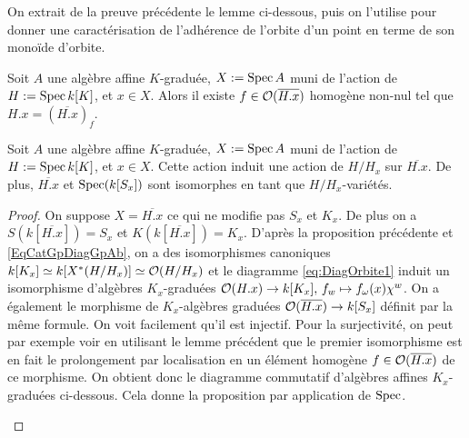 On extrait de la preuve précédente le lemme ci-dessous, puis on l'utilise pour donner une caractérisation de l'adhérence de l'orbite d'un point en terme de son monoïde d'orbite.

\begin{lem}
Soit $A$ une algèbre affine $K$-graduée, $X:=\operatorname{Spec} A$ muni de l'action de $H:=\operatorname{Spec} k[K]$, et $x\in X$. Alors il existe $f\in\mathcal{O}(\overline{H.x})$ homogène non-nul tel que $H.x=(\overline{H.x})_f$.
\end{lem}

\begin{prop}
Soit $A$ une algèbre affine $K$-graduée, $X:=\operatorname{Spec} A$ muni de l'action de $H:=\operatorname{Spec} k[K]$, et $x\in X$. Cette action induit une action de $H/H_x$ sur $\overline{H.x}$. De plus, $\overline{H.x}$ et $\operatorname{Spec}(k[S_x])$ sont isomorphes en tant que $H/H_x$-variétés.
\end{prop}
\begin{proof}
On suppose $X=\overline{H.x}$ ce qui ne modifie pas $S_x$ et $K_x$. De plus on a $S(k[\overline{H.x}])=S_x$ et $K(k[\overline{H.x}])=K_x$. D'après la proposition précédente et \ref{EqCatGpDiagGpAb}, on a des isomorphismes canoniques $k[K_x]\simeq k[X^*(H/H_x)]\simeq \mathcal{O}(H/H_x)$ et le diagramme \ref{eq:DiagOrbite1} induit un isomorphisme d'algèbres $K_x$-graduées $\mathcal{O}(H.x)\rightarrow k[K_x],\, f_w \mapsto f_\omega(x)\chi^w$. On a également le morphisme de $K_x$-algèbres graduées $\mathcal{O}(\overline{H.x})\rightarrow k[S_x]$ définit par la même formule. On voit facilement qu'il est injectif. Pour la surjectivité, on peut par exemple voir en utilisant le lemme précédent que le premier isomorphisme est en fait le prolongement par localisation en un élément homogène $f\in\mathcal{O}(\overline{H.x})$ de ce morphisme. On obtient donc le diagramme commutatif d'algèbres affines $K_x$-graduées ci-dessous. Cela donne la proposition par application de $\operatorname{Spec}$.

	\begin{center}
	\end{center}

\end{proof}


